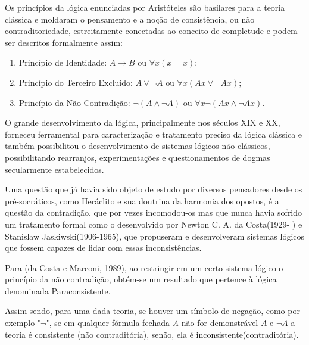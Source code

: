 Os princípios da lógica enunciadas por Aristóteles são basilares para a teoria clássica e moldaram o pensamento e a noção de consistência, ou não contraditoriedade, estreitamente conectadas ao conceito de completude e podem ser descritos formalmente assim:


\begin{enumerate}
\item Princípio de Identidade: 
    \begin{math}
	A \rightarrow B 
	\textrm{ ou } 
	\forall x(x=x);
    \end{math}

\item Princípio do Terceiro Excluído:
    \begin{math}
	A \vee \neg A
	\textrm{ ou }
	\forall x(Ax \vee \neg Ax);
    \end{math}

\item Princípio da Não Contradição: 
    \begin{math}
	\neg (A \wedge \neg A)
	\textrm{ ou }
	\forall x\neg(Ax \wedge \neg Ax).
    \end{math}

\end{enumerate}

O grande desenvolvimento da lógica, principalmente nos séculos XIX e XX, forneceu ferramental para caracterização e tratamento preciso da lógica clássica e também possibilitou o desenvolvimento de sistemas lógicos não clássicos, possibilitando rearranjos, experimentações e questionamentos de dogmas secularmente estabelecidos.

Uma questão que já havia sido objeto de estudo por diversos pensadores desde os pré-socráticos, como Heráclito e sua doutrina da harmonia dos opostos, é a questão da contradição, que por vezes incomodou-os mas que nunca havia sofrido um tratamento formal como o desenvolvido por Newton C. A. da Costa(1929- ) e Stanislaw Jaskiwski(1906-1965), que propuseram e desenvolveram sistemas lógicos que fossem capazes de lidar com essas inconsistências\cite{DecioKrause}. 

Para (da Costa e Marconi, 1989), ao restringir em um certo sistema lógico o princípio da não contradição, obtém-se um resultado que pertence à lógica denominada Paraconsistente.


Assim sendo, para uma dada teoria, se houver um símbolo de negação, como por exemplo "\emph{$\neg $}", se em qualquer fórmula fechada \emph{A} não for demonstrável \emph{$A$} e \emph{$\neg A $} a teoria é consistente (não contraditória), senão, ela é inconsistente(contraditória).


